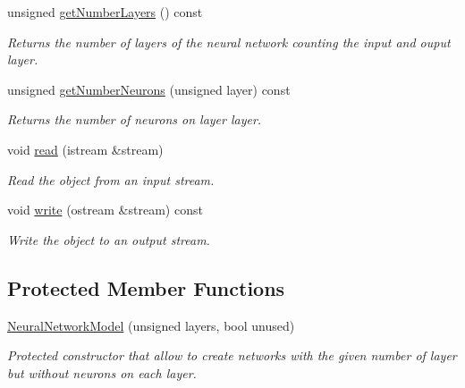 \begin{DoxyCompactItemize}
unsigned \hyperlink{classhappyml_1_1NeuralNetworkModel_a3fd616a220f3e617359b96a31c27b921}{get\+Number\+Layers} () const 
\begin{DoxyCompactList}\small\item\em Returns the number of layers of the neural network counting the input and ouput layer. \end{DoxyCompactList}\item 
unsigned \hyperlink{classhappyml_1_1NeuralNetworkModel_a7bf0503214bcc6de9d3ad646ff7b1b92}{get\+Number\+Neurons} (unsigned layer) const 
\begin{DoxyCompactList}\small\item\em Returns the number of neurons on layer \textquotesingle{}layer\textquotesingle{}. \end{DoxyCompactList}\item 
void \hyperlink{classhappyml_1_1NeuralNetworkModel_a5591e0392dc1ec3d6d730ae355cc7f09}{read} (istream \&stream)
\begin{DoxyCompactList}\small\item\em Read the object from an input stream. \end{DoxyCompactList}\item 
void \hyperlink{classhappyml_1_1NeuralNetworkModel_acaae169ac128c0c707342960e7c048eb}{write} (ostream \&stream) const 
\begin{DoxyCompactList}\small\item\em Write the object to an output stream. \end{DoxyCompactList}\end{DoxyCompactItemize}
\subsection*{Protected Member Functions}
\begin{DoxyCompactItemize}
\item 
\hyperlink{classhappyml_1_1NeuralNetworkModel_a1fbb361d360e321f0b022a9016c0d067}{Neural\+Network\+Model} (unsigned layers, bool unused)
\begin{DoxyCompactList}\small\item\em Protected constructor that allow to create networks with the given number of layer but without neurons on each layer. \end{DoxyCompactList}\end{DoxyCompactItemize}
